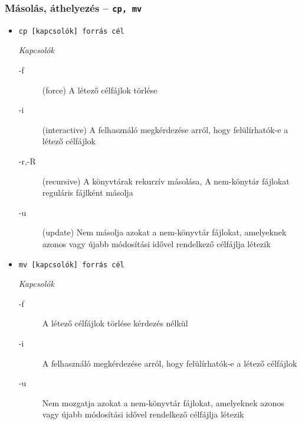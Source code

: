 \subsubsection*{Másolás, áthelyezés -- \texttt{cp, mv}}
\begin{itemize}
\item[]  
	\hfill \texttt{cp [kapcsolók] forrás cél}
\medskip

	\textit{Kapcsolók}
	\begin{description}
	\item[-f] (force) A létező célfájlok törlése
	\item[-i] (interactive) A felhasználó megkérdezése arról, hogy felülírhatók-e a létező célfájlok
	\item[-r,-R] (recursive) A könyvtárak rekurzív másolása, A nem-könytár fájlokat reguláris fájlként másolja 
	\item[-u] (update) Nem másolja azokat a nem-könyvtár fájlokat, amelyeknek azonos vagy újabb módosítási idővel rendelkező célfájlja létezik
	\end{description}


\item[] 
	\hfill\texttt{mv [kapcsolók] forrás cél}
	\medskip
	
	\textit{Kapcsolók}
	\begin{description}
	\item[-f] A létező célfájlok törlése kérdezés nélkül
	\item[-i] A felhasználó megkérdezése arról, hogy felülírhatók-e a létező célfájlok
	\item[-u] Nem mozgatja azokat a nem-könyvtár fájlokat, amelyeknek azonos vagy újabb módosítási idővel rendelkező célfájlja létezik
	\end{description}
\end{itemize}



